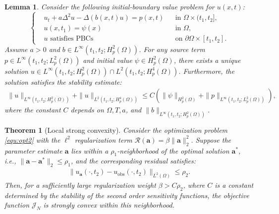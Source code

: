 \documentclass[10pt,a4paper]{amsart}
\newtheorem{lemma}{Lemma}
\newtheorem{theorem}{Theorem}
\begin{document}
\begin{lemma}
	\label{lemma:well_posedness_four_order}
	Consider the following initial-boundary value problem for $u(x,t)$:
	\begin{equation}
		\label{equ:linear CH}
		\left\{
		\begin{aligned}
			&u_{t} + a\Delta^2 u - \Delta (b(x,t)u) = p(x,t) && \text{in }  \Omega \times (t_1,t_2], \\
			&u(x,t_1) = \psi(x) && \text{in } \Omega, \\
			&u \text{ satisfies PBCs} && \text{on } \partial\Omega \times [t_1,t_2].
		\end{aligned}
		\right.
	\end{equation}
	Assume $a > 0$ and $b \in L^{\infty}(t_1,t_2; H_p^2(\Omega))$. For any source term $p \in L^{\infty}(t_1,t_2; L_p^{2}(\Omega))$ and initial value $\psi \in H_p^2(\Omega)$, there exists a unique solution $u \in L^{\infty}(t_1,t_2; H_p^2(\Omega)) \cap L^2(t_1,t_2; H^4_p(\Omega))$. Furthermore, the solution satisfies the stability estimate:
	\begin{align*}
		\|u\|_{L^{\infty}(t_1,t_2; H_p^2(\Omega))} + \|u\|_{L^2(t_1,t_2; H^4_p(\Omega))} \leq C \left( \|\psi\|_{H_p^2(\Omega)} + \|p\|_{L^{\infty}(t_1,t_2; L_p^{2}(\Omega))} \right),
	\end{align*}
	where the constant $C$ depends on $\Omega, T, a$, and $\|b\|_{L^{\infty}(t_1,t_2; H_p^2(\Omega))}$.
\end{lemma}

\begin{theorem}[Local strong convexity]
	Consider the optimization problem \eqref{equ:opt2} with the $\ell^2$ regularization term $\mathcal{R}(\mathbf{a}) = \beta\|\mathbf{a}\|_2^2$. Suppose the parameter estimate $\mathbf{a}$ lies within a $\rho_1$-neighborhood of the optimal solution $\mathbf{a}^{*}$, i.e., $\|\mathbf{a} - \mathbf{a}^{*}\|_2 \leq \rho_1$, and the corresponding residual satisfies:
	\begin{align}
		\|u_{\mathbf{a}}(\cdot,t_2) - u_{\text{obs}}(\cdot,t_2)\|_{L^2(\Omega)} \leq \rho_2.
	\end{align}
	Then, for a sufficiently large regularization weight $\beta > C\rho_2$, where $C$ is a constant determined by the stability of the second order sensitivity functions, the objective function $\mathcal{J}_N$ is strongly convex within this neighborhood.
\end{theorem}
\end{document}
